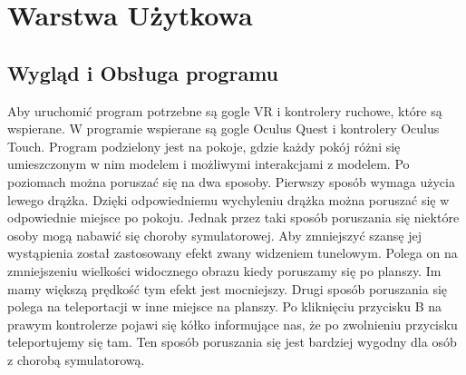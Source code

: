 \documentclass[a4paper,12pt,reqno]{article}
\begin{document}
\newpage
\section{Warstwa Użytkowa}

\subsection{Wygląd i Obsługa programu}

Aby uruchomić program potrzebne są gogle VR i kontrolery ruchowe, które są wspierane. W programie wspierane są gogle Oculus Quest i kontrolery Oculus Touch. Program podzielony jest na pokoje, gdzie każdy pokój różni się umieszczonym w nim modelem i możliwymi interakcjami z modelem. Po poziomach można poruszać się na dwa sposoby. Pierwszy sposób wymaga użycia lewego drążka. Dzięki odpowiedniemu wychyleniu drążka można poruszać się w odpowiednie miejsce po pokoju. Jednak przez taki sposób poruszania się niektóre osoby mogą nabawić się choroby symulatorowej\cite{choroba_vr}. Aby zmniejszyć szansę jej wystąpienia został zastosowany efekt zwany widzeniem tunelowym. Polega on na zmniejszeniu wielkości widocznego obrazu kiedy poruszamy się po planszy. Im mamy większą prędkość tym efekt jest mocniejszy. Drugi sposób poruszania się polega na teleportacji w inne miejsce na planszy. Po kliknięciu przycisku B na prawym kontrolerze pojawi się kółko informujące nas, że po zwolnieniu przycisku teleportujemy się tam. Ten sposób poruszania się jest bardziej wygodny dla osób z chorobą symulatorową.
\end{document}
